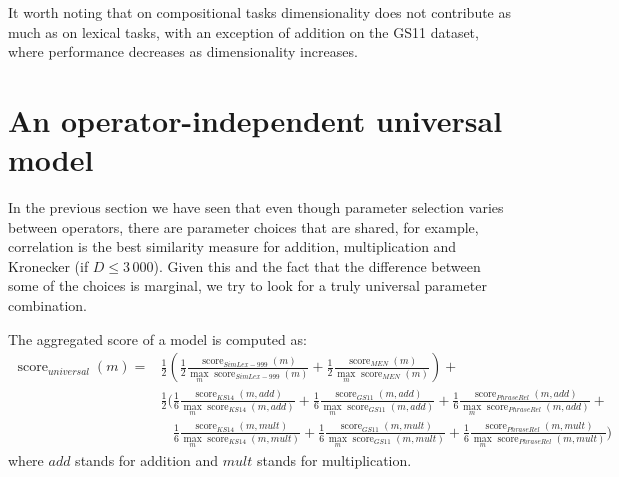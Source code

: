 It worth noting that on compositional tasks dimensionality does not contribute as much as on lexical tasks, with an exception of addition on the GS11 dataset, where performance decreases as dimensionality increases.

\section{An operator-independent universal model}
\label{sec:single}

In the previous section we have seen that even though parameter selection varies between operators, there are parameter choices that are shared, for example, correlation is the best similarity measure for addition, multiplication and Kronecker (if $D \le 3\,000$). Given this and the fact that the difference between some of the choices is marginal, we try to look for a truly universal parameter combination.

The aggregated score of a model is computed as:
%
%
\scriptsize
\begin{align*}
\operatorname{score}_\mathit{universal}(\mathit{m}) = &%
\frac{1}{2}\left(
\frac{1}{2}%
\frac{\operatorname{score}_\mathit{SimLex-999}(\mathit{m})}%
{\max_m\operatorname{score}_\mathit{SimLex-999}(m)}%
+%
\frac{1}{2}%
\frac{\operatorname{score}_\mathit{MEN}(\mathit{m})}%
{\max_m\operatorname{score}_\mathit{MEN}(m)}%
\right)+
\\
&\frac{1}{2}\Bigg(
\frac{1}{6}%
\frac{\operatorname{score}_\mathit{KS14}(\mathit{m}, \mathit{add})}%
{\max_m\operatorname{score}_\mathit{KS14}(m, \mathit{add})}%
+%
\frac{1}{6}%
\frac{\operatorname{score}_\mathit{GS11}(\mathit{m}, \mathit{add})}%
{\max_m\operatorname{score}_\mathit{GS11}(m, \mathit{add})}%
+%
\frac{1}{6}%
\frac{\operatorname{score}_\mathit{PhraseRel}(\mathit{m, \mathit{add}})}%
{\max_m\operatorname{score}_\mathit{PhraseRel}(m, \mathit{add})}
+
\\
&\phantom{\frac{1}{2}\Bigg(}
\frac{1}{6}%
\frac{\operatorname{score}_\mathit{KS14}(\mathit{m}, \mathit{mult})}%
{\max_m\operatorname{score}_\mathit{KS14}(m, \mathit{mult})}%
+%
\frac{1}{6}%
\frac{\operatorname{score}_\mathit{GS11}(\mathit{m}, \mathit{mult})}%
{\max_m\operatorname{score}_\mathit{GS11}(m, \mathit{mult})}%
+%
\frac{1}{6}%
\frac{\operatorname{score}_\mathit{PhraseRel}(\mathit{m, \mathit{mult}})}%
{\max_m\operatorname{score}_\mathit{PhraseRel}(m, \mathit{mult})}
\Bigg)
\end{align*}
\normalsize
where $\mathit{add}$ stands for addition and $\mathit{mult}$ stands for multiplication.
